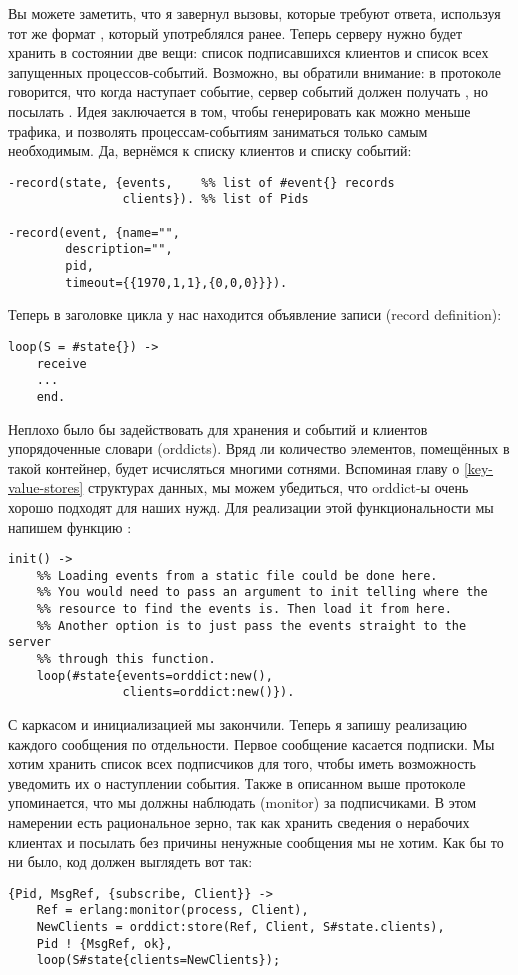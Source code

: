 Вы можете заметить, что я завернул вызовы, которые требуют ответа, используя тот же формат , который употреблялся ранее.
Теперь серверу нужно будет хранить в состоянии две вещи: список подписавшихся клиентов и список всех запущенных процессов\--событий.
Возможно, вы обратили внимание: в протоколе говорится, что когда наступает событие, сервер событий должен получать , но посылать .
Идея заключается в том, чтобы генерировать как можно меньше трафика, и позволять процессам\--событиям заниматься только самым необходимым.
Да, вернёмся к списку клиентов и списку событий:
\begin{lstlisting}[style=erlang]
-record(state, {events,    %% list of #event{} records
                clients}). %% list of Pids
 
-record(event, {name="",
        description="",
        pid,
        timeout={{1970,1,1},{0,0,0}}}).
\end{lstlisting}

Теперь в заголовке цикла у нас находится объявление записи (record definition):
\begin{lstlisting}[style=erlang]
loop(S = #state{}) ->
    receive
    ...
    end.
\end{lstlisting}

Неплохо было бы задействовать для хранения и событий и клиентов упорядоченные словари (orddicts).
Вряд ли количество элементов, помещённых в такой контейнер, будет исчисляться многими сотнями.
Вспоминая главу о \ref{key-value-stores} структурах данных, мы можем убедиться, что orddict-ы очень хорошо подходят для наших нужд.
Для реализации этой функциональности мы напишем функцию :
\begin{lstlisting}[style=erlang]
init() ->
    %% Loading events from a static file could be done here.
    %% You would need to pass an argument to init telling where the
    %% resource to find the events is. Then load it from here.
    %% Another option is to just pass the events straight to the server
    %% through this function.
    loop(#state{events=orddict:new(),
                clients=orddict:new()}).
\end{lstlisting}

С каркасом и инициализацией мы закончили.
Теперь я запишу реализацию каждого сообщения по отдельности.
Первое сообщение касается подписки.
Мы хотим хранить список всех подписчиков для того, чтобы иметь возможность уведомить их о наступлении события.
Также в описанном выше протоколе упоминается, что мы должны наблюдать (monitor) за подписчиками.
В этом намерении есть рациональное зерно, так как хранить сведения о нерабочих клиентах и посылать без причины ненужные сообщения мы не хотим.
Как бы то ни было, код должен выглядеть вот так:
\begin{lstlisting}[style=erlang]
{Pid, MsgRef, {subscribe, Client}} ->
    Ref = erlang:monitor(process, Client),
    NewClients = orddict:store(Ref, Client, S#state.clients),
    Pid ! {MsgRef, ok},
    loop(S#state{clients=NewClients});
\end{lstlisting}

